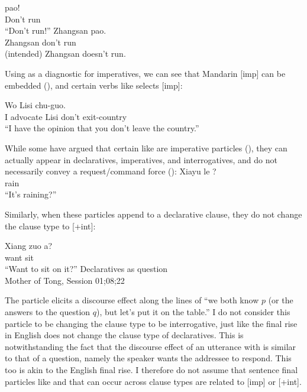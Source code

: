 \bxl\label{ex:man:bie:imp}
\gll {} pao!\\
Don't run\\
``Don't run!''
\ex 
\gll *Zhangsan  pao.\\
Zhangsan don't run\\
(intended) Zhangsan doesn't run.
\exl
\eex 

Using  as a diagnostic for imperatives, we can see that Mandarin [imp] can be embedded (\cite{lithompson, chen2005imp}), and certain verbs like  selects [imp]:

\gll Wo  Lisi  chu-guo.\\
I advocate Lisi don't exit-country\\
\trans ``I have the opinion that you don't leave the country.'' \hfill \textcite[p.458]{lithompson}
\eex

While some have argued that certain  like  are imperative particles (\cite{zhudexi,chao1968,lithompson}), they can actually appear in declaratives, imperatives, and interrogatives, and do not necessarily convey a request/command force (\cite{hanyang1995,liboya2006,ettingermalamud2014,YY2021}):
\gll Xiayu le ?\\
rain \Asp{} \Sfp{}\\
\trans ``It's raining?''
\eex

Similarly, when these particles append to a declarative clause, they do not change the clause type to [+int]:

\gll %
Xiang zuo a?\\
want sit \Sfp{}\\
``Want to sit on it?''
\hfill Declaratives as question\\
\hspace*{\fill} Mother of Tong, Session 01;08;22
\eex

The particle  elicits a discourse effect along the lines of ``we both know $p$ (or the answers to the question $q$), but let's put it on the table.'' I do not consider this particle to be changing the clause type to be interrogative, just like the final rise in English does not change the clause type of declaratives. This is notwithstanding the fact that the discourse effect of an utterance with  is similar to that of a question, namely the speaker wants the addressee to respond. This too is akin to the English final rise.
I therefore do not assume that sentence final particles like  and  that can occur across clause types are related to [imp] or [+int].


